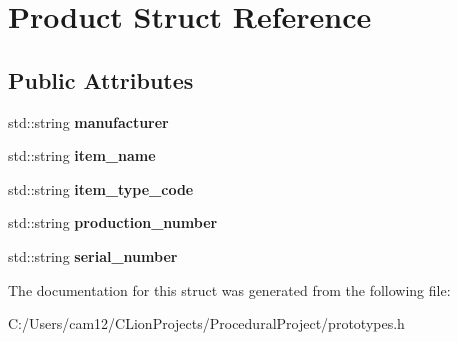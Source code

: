 \hypertarget{struct_product}{}\section{Product Struct Reference}
\label{struct_product}
\subsection*{Public Attributes}
\begin{DoxyCompactItemize}
\item 
\mbox{\label{struct_product_af3d21858bb34986f54309b877678daa8}} 
std\+::string {\bfseries manufacturer}
\item 
\mbox{\label{struct_product_aa0726af4e9f1120d6c249cfa013cc568}} 
std\+::string {\bfseries item\+\_\+name}
\item 
\mbox{\label{struct_product_a69176a940f74c91e008067a4a5409078}} 
std\+::string {\bfseries item\+\_\+type\+\_\+code}
\item 
\mbox{\label{struct_product_a13bbe9b6d4c6a5fb2857064fbd1862da}} 
std\+::string {\bfseries production\+\_\+number}
\item 
\mbox{\label{struct_product_a7e11f777ce7bd1a31e04740cef1298ce}} 
std\+::string {\bfseries serial\+\_\+number}
\end{DoxyCompactItemize}


The documentation for this struct was generated from the following file\+:\begin{DoxyCompactItemize}
\item 
C\+:/\+Users/cam12/\+C\+Lion\+Projects/\+Procedural\+Project/prototypes.\+h\end{DoxyCompactItemize}

